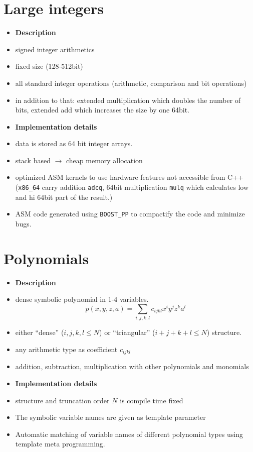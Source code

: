 \documentclass[oribibl]{llncs2e/llncs}
\begin{document}

\section{Large integers}
\begin{itemize}
\item {\bf Description}
\item signed integer arithmetics
\item fixed size (128-512bit)
\item all standard integer operations (arithmetic, comparison and bit operations)
\item in addition to that: extended multiplication which doubles the number of bits, extended add which increases the size by one 64bit.
\item {\bf Implementation details}
\item data is stored as 64 bit integer arrays.
\item stack based $\rightarrow$ cheap memory allocation
\item optimized ASM kernels to use hardware features not accessible from C++ (\verb|x86_64| carry addition \verb|adcq|, 64bit multiplication \verb|mulq| which calculates low and hi 64bit part of the result.)
\item ASM code generated using \verb|BOOST_PP| to compactify the code and minimize bugs.
\end{itemize}

\section{Polynomials}
\begin{itemize}
\item {\bf Description}
\item dense symbolic polynomial in 1-4 variables.
\begin{equation}
    p(x,y,z,a) = \sum_{i,j,k,l} c_{ijkl} x^i y^j z^k a^l
\end{equation}
\item either ``dense'' (${i,j,k,l} \le N$) or ``triangular'' ($i+j+k+l \le N$) structure.
\item any arithmetic type as coefficient $c_{ijkl}$
\item addition, subtraction, multiplication with other polynomials and monomials
\item {\bf Implementation details}
\item structure and truncation order $N$ is compile time fixed 
\item The symbolic variable names are given as template parameter
\item Automatic matching of variable names of different polynomial types using template meta programming.
\end{itemize}
\end{document}
